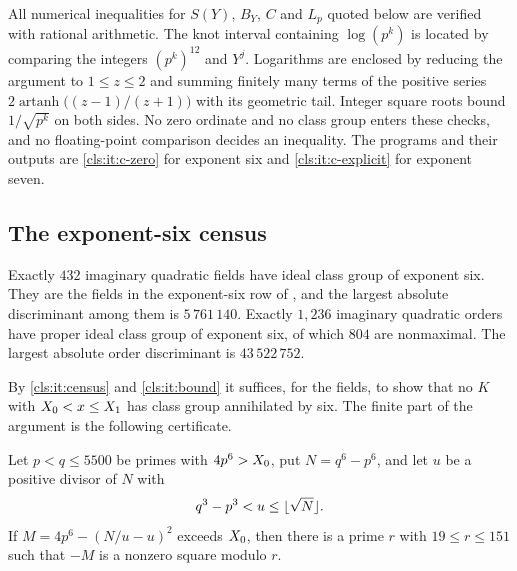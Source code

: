 \begin{remark}\label{cls:rem:exact}
All numerical inequalities for $S(Y)$, $B_Y$, $C$ and $L_p$ quoted below are verified
with rational arithmetic. The knot interval containing $\log(p^k)$ is located by comparing
the integers $(p^k)^{12}$ and $Y^j$. Logarithms are enclosed by reducing the argument to
$1\le z\le2$ and summing finitely many terms of the positive series
$2\operatorname{artanh}\bigl((z-1)/(z+1)\bigr)$ with its geometric tail. Integer square
roots bound $1/\sqrt{p^k}$ on both sides. No zero ordinate and no class group enters these
checks, and no floating-point comparison decides an inequality. The programs and their
outputs are \ref{cls:it:c-zero} for exponent six and \ref{cls:it:c-explicit} for exponent
seven.
\end{remark}

\subsection{The exponent-six census}\label{cls:sec:six}

\begin{theorem}\label{cls:thm:six}
Exactly $432$ imaginary quadratic fields have ideal class group of exponent six. They are
the fields in the exponent-six row of \textup{\cite[Table~1]{Elsenhans2020Imaginary}}, and
the largest absolute discriminant among them is $5\,761\,140$. Exactly $1{,}236$ imaginary
quadratic orders have proper ideal class group of exponent six, of which $804$ are
nonmaximal. The largest absolute order discriminant is $43\,522\,752$.
\end{theorem}

By \ref{cls:it:census} and \ref{cls:it:bound} it suffices, for the fields, to show that no
$K$ with $X_0<x\le X_1$ has class group annihilated by six. The finite part of the
argument is the following certificate.

\begin{lemma}\label{cls:lem:sixpairs}
Let $p<q\le5500$ be primes with $4p^6>X_0$, put $N=q^6-p^6$, and let $u$ be a positive
divisor of $N$ with
\[
   q^3-p^3<u\le\lfloor\sqrt N\rfloor.
\]
If $M=4p^6-(N/u-u)^2$ exceeds $X_0$, then there is a prime $r$ with $19\le r\le151$
such that $-M$ is a nonzero square modulo $r$.
\end{lemma}

